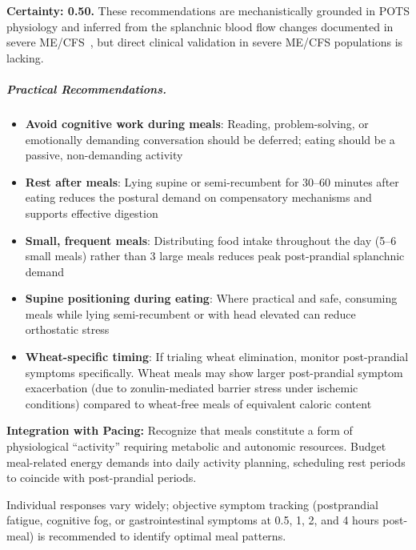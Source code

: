 \begin{hypothesis}
\label{hyp:postprandial-pacing}

\textbf{Certainty: 0.50.} These recommendations are mechanistically grounded in POTS physiology and inferred from the splanchnic blood flow changes documented in severe ME/CFS~\cite{terSteege2012}, but direct clinical validation in severe ME/CFS populations is lacking.

\subparagraph{Practical Recommendations.}

\begin{itemize}
    \item \textbf{Avoid cognitive work during meals}: Reading, problem-solving, or emotionally demanding conversation should be deferred; eating should be a passive, non-demanding activity
    \item \textbf{Rest after meals}: Lying supine or semi-recumbent for 30--60 minutes after eating reduces the postural demand on compensatory mechanisms and supports effective digestion
    \item \textbf{Small, frequent meals}: Distributing food intake throughout the day (5--6 small meals) rather than 3 large meals reduces peak post-prandial splanchnic demand
    \item \textbf{Supine positioning during eating}: Where practical and safe, consuming meals while lying semi-recumbent or with head elevated can reduce orthostatic stress
    \item \textbf{Wheat-specific timing}: If trialing wheat elimination, monitor post-prandial symptoms specifically. Wheat meals may show larger post-prandial symptom exacerbation (due to zonulin-mediated barrier stress under ischemic conditions) compared to wheat-free meals of equivalent caloric content
\end{itemize}

\textbf{Integration with Pacing:} Recognize that meals constitute a form of physiological ``activity'' requiring metabolic and autonomic resources. Budget meal-related energy demands into daily activity planning, scheduling rest periods to coincide with post-prandial periods.

Individual responses vary widely; objective symptom tracking (postprandial fatigue, cognitive fog, or gastrointestinal symptoms at 0.5, 1, 2, and 4 hours post-meal) is recommended to identify optimal meal patterns.

\end{hypothesis}

